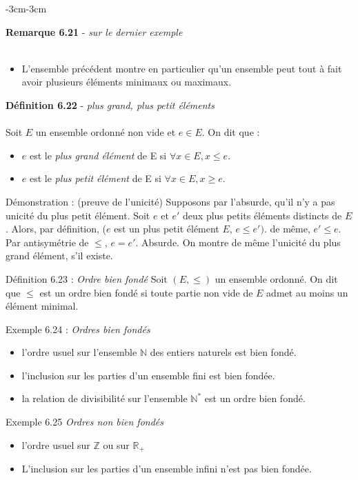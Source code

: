 \documentclass{article}
\newcommand{\notion}[1]{\textcolor{vert_fonce}{\textit{#1}}}
\newenvironment{definition}[2]
{
    \begin{boite_definition}
    \textbf{\textcolor{rouge_fonce}{Définition #1}} - \textit{#2} \\ \\
}
{
    \end{boite_definition}
    \vspace{15pt}
}
\newenvironment{remarque}[2]
{
    \begin{boite_remarque}
    \textbf{\textcolor{bleu_fonce}{Remarque #1}} - \textit{#2} \\ \\
    \begin{itemize}[label=$\blacktriangleright \quad $ ]                    
}
{   
    \end{itemize}
    \end{boite_remarque}
    
}
\begin{document}
\begin{adjustwidth}{-3cm}{-3cm}
\begin{remarque}{6.21}{sur le dernier exemple}
    \item L'ensemble précédent montre en particulier qu'un ensemble peut tout à fait avoir plusieurs éléments minimaux ou maximaux.
\end{remarque}

\begin{definition}{6.22}{plus grand, plus petit éléments}
    Soit $E$ un ensemble ordonné non vide et $e\in E$. On dit que :
    \begin{itemize}
        \item $e$ est le \notion{plus grand élément} de E si $\forall x \in E, x \leq e$.
        \item $e$ est le \notion{plus petit élément} de E si $\forall x \in E, x \geq e$.
    \end{itemize}
\end{definition}


Démonstration : (preuve de l'unicité)
Supposons par l'absurde, qu'il n'y a pas unicité du plus petit élément. 
Soit $e$ et $e'$ deux plus petits éléments distincts de $E$. 
Alors, par définition, ($e$ est un plus petit élément $E$, $e \leq e')$. de même, $e' \leq e$. 
Par antisymétrie de $\leq$, $e=e'$. Absurde.
On montre de même l'unicité du plus grand élément, s'il existe.

Définition 6.23 : \textit{Ordre bien fondé}
Soit $(E,\leq)$ un ensemble ordonné.
On dit que $\leq$ est un ordre bien fondé si toute partie non vide de $E$ admet au moins un élément minimal.

Exemple 6.24 : \textit{Ordres bien fondés}
    \begin{itemize}
        \item l'ordre usuel sur l'ensemble $\mathbb{N}$ des entiers naturels est bien fondé.
        \item l'inclusion sur les parties d'un ensemble fini est bien fondée.
        \item la relation de divisibilité sur l'ensemble $\mathbb{N}^*$ est un ordre bien fondé.
    \end{itemize}

    Exemple 6.25 \textit{Ordres non bien fondés}
    \begin{itemize}
        \item l'ordre usuel sur $\mathbb{Z}$ ou sur $\mathbb{R_+}$
        \item L'inclusion sur les parties d'un ensemble infini n'est pas bien fondée.
    \end{itemize}


\end{adjustwidth}
\end{document}
